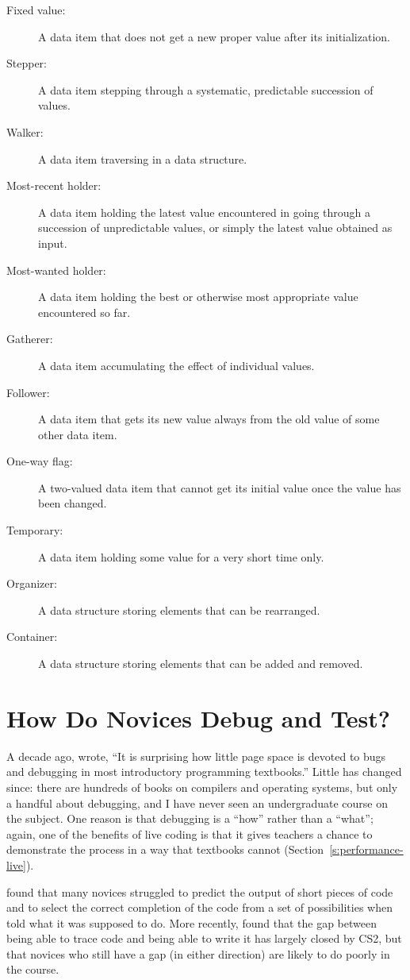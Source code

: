 \begin{description}
\item[Fixed value:]
A data item that does not get a new proper value after its
initialization.
\item[Stepper:]
A data item stepping through a systematic, predictable succession of
values.
\item[Walker:]
A data item traversing in a data structure.
\item[Most-recent holder:]
A data item holding the latest value encountered in going through a
succession of unpredictable values, or simply the latest value
obtained as input.
\item[Most-wanted holder:]
A data item holding the best or otherwise most appropriate value
encountered so far.
\item[Gatherer:]
A data item accumulating the effect of individual values.
\item[Follower:]
A data item that gets its new value always from the old value of
some other data item.
\item[One-way flag:]
A two-valued data item that cannot get its initial value once the
value has been changed.
\item[Temporary:]
A data item holding some value for a very short time only.
\item[Organizer:]
A data structure storing elements that can be rearranged.
\item[Container:]
A data structure storing elements that can be added and removed.
\end{description}

\section{How Do Novices Debug and Test?}\label{s:pck-debug}

A decade ago, \cite{McCa2008} wrote, ``It is surprising how little
page space is devoted to bugs and debugging in most introductory
programming textbooks.'' Little has changed since: there are hundreds of
books on compilers and operating systems, but only a handful about
debugging, and I have never seen an undergraduate course on the subject.
One reason is that debugging is a ``how'' rather than a ``what''; again, one
of the benefits of live coding is that it gives teachers a chance to
demonstrate the process in a way that textbooks cannot
(Section~\ref{s:performance-live}).

\cite{List2004,List2009} found that many novices struggled to predict
the output of short pieces of code and to select the correct completion
of the code from a set of possibilities when told what it was supposed
to do. More recently, \cite{Harr2018} found that the gap between
being able to trace code and being able to write it has largely closed
by CS2, but that novices who still have a gap (in either direction) are
likely to do poorly in the course.

